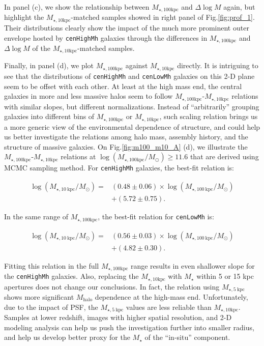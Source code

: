 \documentclass{emulateapj}
\def\rbcg{\texttt{cenHighMh}}
\def\nbcg{\texttt{cenLowMh}}
\def\mstar{{$M_{\star}$}}
\def\mhalo{{$M_{\mathrm{halo}}$}}
\def\minn{{$M_{\star,10\mathrm{kpc}}$}}
\def\mtot{{$M_{\star,100\mathrm{kpc}}$}}
\def\logmtot{{$\log (M_{\star,100\mathrm{kpc}}/M_{\odot})$}}
\newcommand{\update}[1]{\textcolor{Bittersweet}{#1}}
\begin{document}
\begin{CJK*}{UTF8}{gbsn}
    In panel (c), we show the relationship between \mtot{} and $\Delta \log M$ 
    again, but highlight the \minn{}-matched samples showed in right panel of 
    Fig.\ref{fig:prof_1}. 
    \update{
    Their distributions clearly show the impact of the much more prominent outer 
    envelope hosted by \rbcg{} galaxies through the differences in \mtot{} and 
    $\Delta \log M$ of the \minn{}-matched samples.
    }
    
    Finally, in panel (d), we plot \mtot{} against \minn{} directly.  
    It is intriguing to see that the distributions of \rbcg{} and \nbcg{} galaxies 
    on this 2-D plane seem to be offset with each other. 
    At least at the high mass end, the central galaxies in more and less massive 
    halos seem to follow \mtot{}-\minn{} relations with similar slopes, but different 
    normalizations.  
    Instead of ``arbitrarily'' grouping galaxies into different bins of \mtot{} or 
    \minn{}, such scaling relation brings us a more generic view of the environmental 
    dependence of structure, and could help us better investigate the relations among 
    halo mass, assembly history, and the structure of massive galaxies.
    On Fig.\ref{fig:m100_m10_A} (d), we illustrate the \mtot{}-\minn{} relations 
    at \logmtot$\geq 11.6$ that are derived using MCMC sampling method.  
    For \rbcg{} galaxies, the best-fit relation is:
    
    \begin{equation}
        \begin{aligned}
        \log (M_{\star, 10\ \mathrm{kpc}}/M_{\odot}) = & (0.48\pm0.06) \times \log (M_{\star, 100\ \mathrm{kpc}}/M_{\odot}) \\ & +(5.72\pm0.75).
        \end{aligned}
    \end{equation}
    
    \noindent In the same range of \mtot{}, the best-fit relation for \nbcg{} is:
     
    \begin{equation}
        \begin{aligned}
        \log (M_{\star, 10\ \mathrm{kpc}}/M_{\odot}) = & (0.56\pm0.03) \times \log (M_{\star, 100\ \mathrm{kpc}}/M_{\odot}) \\ & +(4.82\pm0.30).
        \end{aligned}
    \end{equation}
     
    Fitting this relation in the full \mtot{} range results in even shallower slope for 
    the \rbcg{} galaxies. 
    Also, replacing the \minn{} with \mstar{} within 5 or 15 kpc apertures does not change 
    our conclusions. 
    In fact, the relation using $M_{\star, 5\ \mathrm{kpc}}$ shows more significant 
    \mhalo{} dependence at the high-mass end. 
    Unfortunately, due to the impact of PSF, the $M_{\star, 5\ \mathrm{kpc}}$ values 
    are less reliable than \minn{}. 
    \update{
    Samples at lower redshift, images with higher spatial resolution, and 2-D modeling 
    analysis can help us push the investigation further into smaller radius, and help 
    us develop better proxy for the \mstar{} of the ``in-situ'' component.  
    }
    

\end{CJK*}
\end{document}
